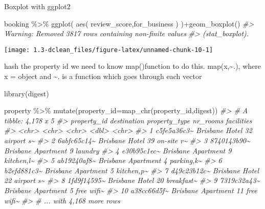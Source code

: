 \documentclass[
]{article}
\newenvironment{Shaded}{\begin{snugshade}}{\end{snugshade}}
\newcommand{\AttributeTok}[1]{\textcolor[rgb]{0.77,0.63,0.00}{#1}}
\newcommand{\CommentTok}[1]{\textcolor[rgb]{0.56,0.35,0.01}{\textit{#1}}}
\newcommand{\FunctionTok}[1]{\textcolor[rgb]{0.00,0.00,0.00}{#1}}
\newcommand{\NormalTok}[1]{#1}
\newcommand{\SpecialCharTok}[1]{\textcolor[rgb]{0.00,0.00,0.00}{#1}}
\begin{document}
Boxplot with ggplot2

\begin{Shaded}
\begin{Highlighting}[]
\NormalTok{booking }\SpecialCharTok{\%\textgreater{}\%} 
  \FunctionTok{ggplot}\NormalTok{(}
    \FunctionTok{aes}\NormalTok{(}
\NormalTok{      review\_score,for\_business}
\NormalTok{    )}
\NormalTok{  )}\SpecialCharTok{+}\FunctionTok{geom\_boxplot}\NormalTok{()}
\CommentTok{\#\textgreater{} Warning: Removed 3817 rows containing non{-}finite values}
\CommentTok{\#\textgreater{} (stat\_boxplot).}
\end{Highlighting}
\end{Shaded}

\texttt{[image: 1.3-dclean\_files/figure-latex/unnamed-chunk-10-1]}

hash the property id
we need to know map()function to do this. map(x,\textasciitilde.), where x = object and \textasciitilde. is a function which goes through each vector

\begin{Shaded}
\begin{Highlighting}[]
\FunctionTok{library}\NormalTok{(digest)}

\NormalTok{property }\SpecialCharTok{\%\textgreater{}\%} 
  \FunctionTok{mutate}\NormalTok{(}\AttributeTok{property\_id=}\FunctionTok{map\_chr}\NormalTok{(property\_id,digest))}
\CommentTok{\#\textgreater{} \# A tibble: 4,178 x 5}
\CommentTok{\#\textgreater{}    property\_id destination property\_type nr\_rooms facilities}
\CommentTok{\#\textgreater{}    \textless{}chr\textgreater{}       \textless{}chr\textgreater{}       \textless{}chr\textgreater{}            \textless{}dbl\textgreater{} \textless{}chr\textgreater{}     }
\CommentTok{\#\textgreater{}  1 c5fe5a36c3\textasciitilde{} Brisbane    Hotel               32 airport s\textasciitilde{}}
\CommentTok{\#\textgreater{}  2 6abfc65c14\textasciitilde{} Brisbane    Hotel               39 on{-}site r\textasciitilde{}}
\CommentTok{\#\textgreater{}  3 8740143b90\textasciitilde{} Brisbane    Apartment            9 laundry   }
\CommentTok{\#\textgreater{}  4 e30b95c1ec\textasciitilde{} Brisbane    Apartment            9 kitchen,l\textasciitilde{}}
\CommentTok{\#\textgreater{}  5 ab19240af8\textasciitilde{} Brisbane    Apartment            4 parking,k\textasciitilde{}}
\CommentTok{\#\textgreater{}  6 b2efd881c3\textasciitilde{} Brisbane    Apartment            5 kitchen,p\textasciitilde{}}
\CommentTok{\#\textgreater{}  7 d49c23b12c\textasciitilde{} Brisbane    Hotel               22 airport s\textasciitilde{}}
\CommentTok{\#\textgreater{}  8 1fd9f14595\textasciitilde{} Brisbane    Hotel               20 breakfast\textasciitilde{}}
\CommentTok{\#\textgreater{}  9 7319c32a43\textasciitilde{} Brisbane    Apartment            5 free wifi\textasciitilde{}}
\CommentTok{\#\textgreater{} 10 a38cc66d5f\textasciitilde{} Brisbane    Apartment           11 free wifi\textasciitilde{}}
\CommentTok{\#\textgreater{} \# ... with 4,168 more rows}
\end{Highlighting}
\end{Shaded}
\end{document}
